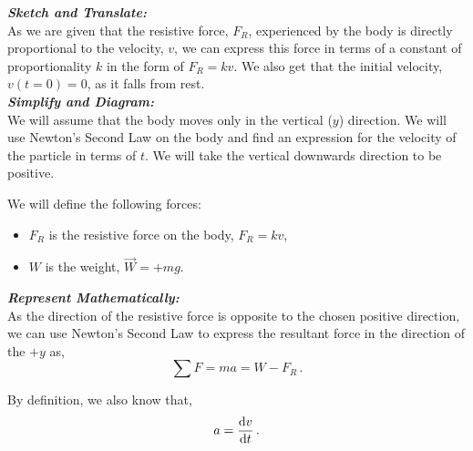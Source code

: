 \begin{subquestions}
\begin{subsubquestions}
\end{subsubquestions}


\subquestion

\begin{subsubquestions}
	
\subsubquestion

\textbf{\textit{Sketch and Translate:}} \\
As we are given that the resistive force, $F_R$, experienced by the body is directly proportional to the velocity, $v$, we can express this force in terms of a constant of proportionality $k$ in the form of $F_R=kv$. We also get that the initial velocity, $v(t=0)=0$, as it falls from rest.\\




\textbf{\textit{Simplify and Diagram:}} \\
We will assume that the body moves only in the vertical ($y$) direction. We will use Newton's Second Law on the body and find an expression for the velocity of the particle in terms of $t$.
We will take the vertical downwards direction to be positive.

We will define the following forces: 
\begin{itemize}
	\item $F_R$ is the resistive force on the body, $F_R=kv$,
	\item $W$ is the weight, $\vec{W}=+mg$.
\end{itemize}




\textbf{\textit{Represent Mathematically:}} \\ 
As the direction of the resistive force is opposite to the chosen positive direction, we can use Newton's Second Law to express the resultant force in the direction of the $+y$ as,
\begin{equation}
	\sum F = ma = W - F_R \label{2005:q5:FEqn1} \,.
\end{equation}

By definition, we also know that,
\begin{equation}
	a = \frac{\mathrm{d}v}{\mathrm{d}t} \label{2005:q5:AEqn2} \,.
\end{equation}


\end{subsubquestions}
\end{subquestions}

